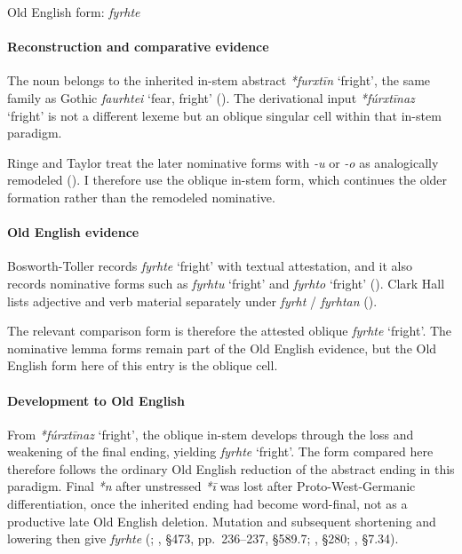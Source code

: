 \documentclass[
  british,
  a4paper,
]{article}
\providecommand{\Recon}[1]{\emph{*#1}}
\begin{document}
Old English form: \emph{fyrhte}

\paragraph{Reconstruction and comparative
evidence}\label{reconstruction-and-comparative-evidence-131}

The noun belongs to the inherited in-stem abstract \Recon{furxtīn}
`fright', the same family as Gothic {\emph{faurhtei}} `fear, fright'
(). The derivational input
\Recon{fúrxtīnaz} `fright' is not a different lexeme but an oblique
singular cell within that in-stem paradigm.

Ringe and Taylor treat the later nominative forms with \emph{-u} or
\emph{-o} as analogically remodeled
(). I
therefore use the oblique in-stem form, which continues the older
formation rather than the remodeled nominative.

\paragraph{Old English evidence}\label{old-english-evidence-133}

Bosworth-Toller records {\emph{fyrhte}} `fright' with textual
attestation, and it also records nominative forms such as
{\emph{fyrhtu}} `fright' and {\emph{fyrhto}} `fright'
().
Clark Hall lists adjective and verb material separately under
\emph{fyrht} / \emph{fyrhtan} ().

The relevant comparison form is therefore the attested oblique
{\emph{fyrhte}} `fright'. The nominative lemma forms remain part of the
Old English evidence, but the Old English form here of this entry is the
oblique cell.

\paragraph{Development to Old
English}\label{development-to-old-english-131}

From \Recon{fúrxtīnaz} `fright', the oblique in-stem develops through
the loss and weakening of the final ending, yielding {\emph{fyrhte}}
`fright'. The form compared here therefore follows the ordinary Old
English reduction of the abstract ending in this paradigm. Final
\emph{*n} after unstressed \emph{*ī} was lost after Proto-West-Germanic
differentiation, once the inherited ending had become word-final, not as
a productive late Old English deletion. Mutation and subsequent
shortening and lowering then give \emph{fyrhte}
(;
, §473, pp.~236--237,
§589.7; , §280;
, §7.34).
\end{document}
